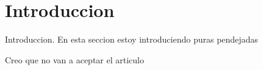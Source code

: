\section{Introduccion}

Introduccion. En esta seccion estoy introduciendo puras pendejadas

Creo que no van a aceptar el articulo
